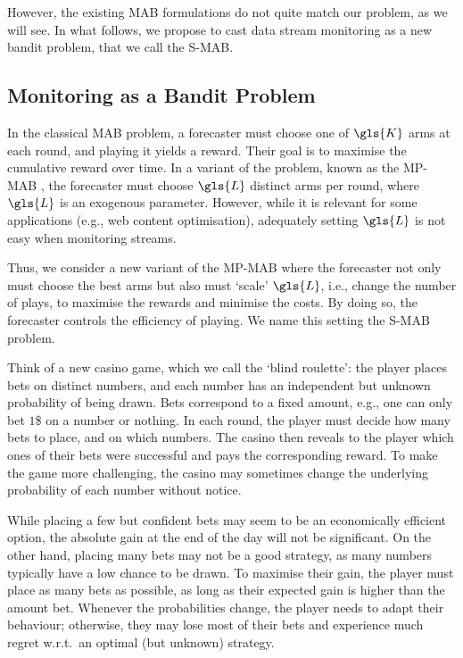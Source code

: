 However, the existing \gls{MAB} formulations do not quite match our problem, as we will see. In what follows, we propose to cast data stream monitoring as a new bandit problem, that we call the \gls{S-MAB}. 

\subsection{Monitoring as a Bandit Problem} 

In the classical \gls{MAB} problem, a forecaster must choose one of $\gls{K}$ arms at each round, and playing it yields a reward. Their goal is to maximise the cumulative reward over time. In a variant of the problem, known as the \gls{MP-MAB} \cite{1104491,DBLP:conf/icml/KomiyamaHN15}, the forecaster must choose $\gls{L}$ distinct arms per round, where $\gls{L}$ is an exogenous parameter. However, while it is relevant for some applications (e.g., web content optimisation), adequately setting $\gls{L}$ is not easy when monitoring streams. %

Thus, we consider a new variant of the \gls{MP-MAB} where the forecaster not only must choose the best arms but also must `scale' $\gls{L}$, i.e., change the number of plays, to maximise the rewards and minimise the costs. %
By doing so, the forecaster controls the efficiency of playing. We name this setting the \acrfull{S-MAB} problem.

Think of a new casino game, which we call the `blind roulette': the player places bets on distinct numbers, and each number has an independent but unknown probability of being drawn. Bets correspond to a fixed amount, e.g., one can only bet $1$\$ on a number or nothing. 
In each round, the player must decide how many bets to place, and on which numbers. 
The casino then reveals to the player which ones of their bets were successful and pays the corresponding reward. To make the game more challenging, the casino may sometimes change the underlying probability of each number without notice.  

While placing a few but confident bets may seem to be an economically efficient option, the absolute gain at the end of the day will not be significant. 
On the other hand, placing many bets may not be a good strategy, as many numbers typically have a low chance to be drawn. 
To maximise their gain, the player must place as many bets as possible, as long as their expected gain is higher than the amount bet. 
Whenever the probabilities change, the player needs to adapt their behaviour; otherwise, they may lose most of their bets and experience much regret w.r.t.\ an optimal (but unknown) strategy.

